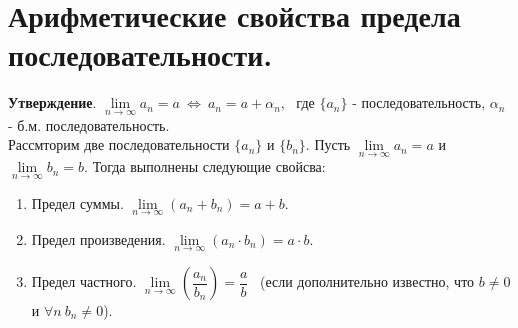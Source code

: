\documentclass[12pt]{article}
\begin{document}
\section{Арифметические свойства предела последовательности.}
\textbf{Утверждение}. $\lim\limits_{n \to \infty} a_n  = a \ \Leftrightarrow \ a_n = a + \alpha_n$, \ где $\{a_n\}$ - последовательность, $\alpha_n$ - б.м. последовательность. 
\\
Рассмторим две последовательности $\{a_n\}$ и $\{b_n\}$. Пусть $\lim\limits_{n \to \infty} a_n = a$ и $\lim\limits_{n \to \infty} b_n = b$. Тогда выполнены следующие свойсва: 
\begin{enumerate}[itemsep=0mm, topsep=0mm, partopsep=0mm]
    \item Предел суммы. $\lim\limits_{n \to \infty} (a_n + b_n) = a + b$.
    \item Предел произведения. $\lim\limits_{n \to \infty} (a_n \cdot b_n) = a \cdot b$.
    \item Предел частного. $\lim\limits_{n \to \infty} \left(\dfrac{a_n}{b_n}\right) = \dfrac{a}{b}$ \ (если дополнительно известно, что $b \neq 0$ и $\forall n \ b_n \neq 0$).
\end{enumerate}
\end{document}
